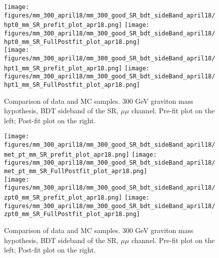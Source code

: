 \begin{figure}[H]
  \begin{center}
    \texttt{[image: figures/mm\_300\_april18/mm\_300\_good\_SR\_bdt\_sideBand\_april18/hpt0\_mm\_SR\_prefit\_plot\_apr18.png]}
    \texttt{[image: figures/mm\_300\_april18/mm\_300\_good\_SR\_bdt\_sideBand\_april18/hpt0\_mm\_SR\_FullPostfit\_plot\_apr18.png]}\\
    \texttt{[image: figures/mm\_300\_april18/mm\_300\_good\_SR\_bdt\_sideBand\_april18/hpt1\_mm\_SR\_prefit\_plot\_apr18.png]}
    \texttt{[image: figures/mm\_300\_april18/mm\_300\_good\_SR\_bdt\_sideBand\_april18/hpt1\_mm\_SR\_FullPostfit\_plot\_apr18.png]}\\
    \caption[Data-MC comparison in the BDT sideband of the SR.]{Comparison of data and MC samples. 300 GeV graviton mass hypothesis, BDT sideband of the SR, $\mu\mu$ channel. Pre-fit plot on the left; Post-fit plot on the right.}
    \label{MCcomparisons_mm_low_SR_bdt_sideband_3}
  \end{center}
\end{figure}

    \begin{figure}[H]
  \begin{center}
    \texttt{[image: figures/mm\_300\_april18/mm\_300\_good\_SR\_bdt\_sideBand\_april18/met\_pt\_mm\_SR\_prefit\_plot\_apr18.png]}
    \texttt{[image: figures/mm\_300\_april18/mm\_300\_good\_SR\_bdt\_sideBand\_april18/met\_pt\_mm\_SR\_FullPostfit\_plot\_apr18.png]}\\
    \texttt{[image: figures/mm\_300\_april18/mm\_300\_good\_SR\_bdt\_sideBand\_april18/zpt0\_mm\_SR\_prefit\_plot\_apr18.png]}
    \texttt{[image: figures/mm\_300\_april18/mm\_300\_good\_SR\_bdt\_sideBand\_april18/zpt0\_mm\_SR\_FullPostfit\_plot\_apr18.png]}\\
\caption[Data-MC comparison in the BDT sideband of the SR.]{Comparison of data and MC samples. 300 GeV graviton mass hypothesis, BDT sideband of the SR, $\mu\mu$ channel. Pre-fit plot on the left; Post-fit plot on the right.}
    \label{MCcomparisons_mm_low_SR_bdt_sideband_4}
  \end{center}
\end{figure}



